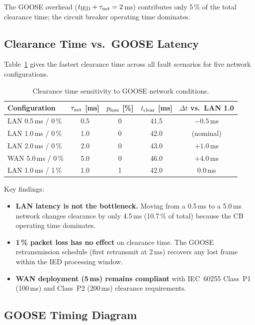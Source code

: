 \documentclass[12pt,a4paper]{article}
\begin{document}
\noindent
The GOOSE overhead ($t_{\rm IED} + \tau_{\rm net} = 2$\,ms) contributes
only 5\,\% of the total clearance time; the circuit breaker operating
time dominates.

\subsection{Clearance Time vs.\ GOOSE Latency}

Table~\ref{tab:latency_sweep} gives the fastest clearance time across
all fault scenarios for five network configurations.

\begin{table}[H]
  \centering
  \caption{Clearance time sensitivity to GOOSE network conditions.}
  \label{tab:latency_sweep}
  \begin{tabular}{lcccc}
    \toprule
    Configuration & $\tau_{\rm net}$ [ms] & $p_{\rm loss}$ [\%]
                  & $t_{\rm clear}$ [ms] & $\Delta t$ vs.\ LAN 1.0 \\
    \midrule
    LAN 0.5\,ms / 0\,\%  & 0.5 & 0  & 41.5 & $-0.5$\,ms \\
    LAN 1.0\,ms / 0\,\%  & 1.0 & 0  & 42.0 & (nominal)  \\
    LAN 2.0\,ms / 0\,\%  & 2.0 & 0  & 43.0 & $+1.0$\,ms \\
    WAN 5.0\,ms / 0\,\%  & 5.0 & 0  & 46.0 & $+4.0$\,ms \\
    LAN 1.0\,ms / 1\,\%  & 1.0 & 1  & 42.0 & $0.0$\,ms  \\
    \bottomrule
  \end{tabular}
\end{table}

Key findings:
\begin{itemize}
  \item \textbf{LAN latency is not the bottleneck.}  Moving from a
    0.5\,ms to a 5.0\,ms network changes clearance by only 4.5\,ms
    (10.7\,\% of total) because the CB operating time dominates.
  \item \textbf{1\,\% packet loss has no effect} on clearance time.
    The GOOSE retransmission schedule (first retransmit at 2\,ms)
    recovers any lost frame within the IED processing window.
  \item \textbf{WAN deployment (5\,ms) remains compliant} with
    IEC~60255 Class~P1 (100\,ms) and Class~P2 (200\,ms) clearance
    requirements.
\end{itemize}

\subsection{GOOSE Timing Diagram}
\end{document}
